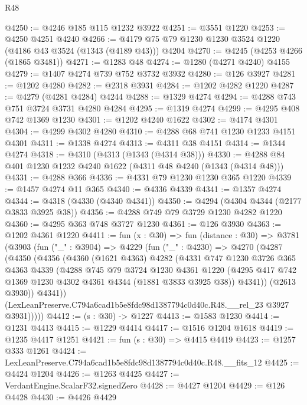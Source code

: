 \begin{lexlean}{R48}
\begin{coremodule}
@4250 := @4246 @185 @115 @1232 @3922
@4251 := @3551 @1220
@4253 := @4250 @4251 @4240
@4266 := @4179 @75 @79 @1230 @1230 @3524 @1220 (@4186 @43 @3524 (@1343 (@4189 @43))) @4204
@4270 := @4245 (@4253 @4266 (@1865 @3481))
@4271 := @1283 @48
@4274 := @1280 (@4271 @4240) @4155
@4279 := @1407 @4274 @739 @752 @3732 @3932
@4280 := @126 @3927
@4281 := @1202 @4280
@4282 := @2318 @3931
@4284 := @1202 @4282 @1220
@4287 := @4279 (@4281 @4284) @4244
@4288 := @1329 @4274
@4294 := @4288 @743 @751 @3724 @3731 @4280 @4284
@4295 := @1319 @4274
@4299 := @4295 @408 @742 @1369 @1230
@4301 := @1202 @4240 @1622
@4302 := @4174 @4301
@4304 := @4299 @4302 @4280
@4310 := @4288 @68 @741 @1230 @1233 @4151 @4301
@4311 := @1338 @4274
@4313 := @4311 @38 @4151
@4314 := @1344 @4274
@4318 := @4310 (@4313 (@1343 (@4314 @38)))
@4330 := @4288 @84 @401 @1230 @1232 @4240 @1622 (@4311 @48 @4240 (@1343 (@4314 @48)))
@4331 := @4288 @366
@4336 := @4331 @79 @1230 @1230 @365 @1220
@4339 := @1457 @4274 @11 @365
@4340 := @4336 @4339
@4341 := @1357 @4274
@4344 := @4318 (@4330 (@4340 @4341))
@4350 := @4294 (@4304 @4344 (@2177 @3833 @3925 @38))
@4356 := @4288 @749 @79 @3729 @1230 @4282 @1220
@4360 := @4295 @363 @748 @3727 @1230
@4361 := @126 @3930
@4363 := @1202 @4361 @1220
@4411 := fun (x : @30) =>
  fun (distance : @30) =>
  @3781
    (@3903
      (fun ("_" : @3904) =>
      @4229
        (fun ("_" : @4230) =>
        @4270
          (@4287
            (@4350
              (@4356
                (@4360
                  (@1621 @4363)
                  @4282
                  (@4331
                    @747
                    @1230
                    @3726
                    @365
                    @4363
                    @4339
                    (@4288
                      @745
                      @79
                      @3724
                      @1230
                      @4361
                      @1220
                      (@4295 @417 @742 @1369 @1230 @4302 @4361 @4344 (@1881 @3833 @3925 @38))
                      @4341))
                  (@2613 @3930))
                @4341))
            (LexLeanPreserve.C794a6cad1b5e8fdc98d1387794c0d40c.R48.__rel_23 @3927 @3931)))))
@4412 := (s : @30) -> @1227
@4413 := @1583 @1230
@4414 := @1231 @4413
@4415 := @1229 @4414
@4417 := @1516 @1204 @1618
@4419 := @1235 @4417 @1251
@4421 := fun (s : @30) => @4415 @4419
@4423 := @1257 @333 @1261
@4424 := LexLeanPreserve.C794a6cad1b5e8fdc98d1387794c0d40c.R48.__fits_12
@4425 := @4424 @1204
@4426 := @1263 @4425
@4427 := VerdantEngine.ScalarF32.signedZero
@4428 := @4427 @1204
@4429 := @126 @4428
@4430 := @4426 @4429

\end{coremodule}
\end{lexlean}
